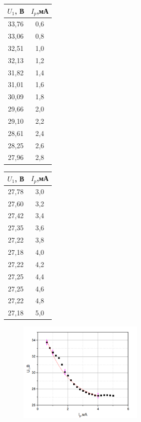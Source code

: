 \documentclass[a4paper]{article}
\begin{document}
  \begin{table}[!h]
  \begin{floatrow}
   \ttabbox[\FBwidth]{}%
           {
\begin{tabular}{|c|c|}
\hline
$U_1$, В & $I_p$,мА \\ \hline
33,76   & 0,6     \\ \hline
33,06   & 0,8     \\ \hline
32,51   & 1,0       \\ \hline
32,13   & 1,2     \\ \hline
31,82   & 1,4     \\ \hline
31,01   & 1,6     \\ \hline
30,09   & 1,8     \\ \hline
29,66   & 2,0       \\ \hline
29,10    & 2,2     \\ \hline
28,61   & 2,4     \\ \hline
28,25   & 2,6     \\ \hline
27,96   & 2,8     \\ \hline
\end{tabular}
    }
   \ttabbox[\FBwidth]{}%
           {
\begin{tabular}{|c|c|}
\hline
$U_1$, В & $I_p$,мА \\ \hline
27,78   & 3,0       \\ \hline
27,60    & 3,2     \\ \hline
27,42   & 3,4     \\ \hline
27,35   & 3,6     \\ \hline
27,22   & 3,8     \\ \hline
27,18   & 4,0       \\ \hline
27,22   & 4,2     \\ \hline
27,25   & 4,4     \\ \hline
27,25   & 4,6     \\ \hline
27,22   & 4,8     \\ \hline
27,18   & 5,0       \\ \hline
\end{tabular}
           }
\end{floatrow}
\end{table}

\newpage
\begin{figure}[!h]
\centering
\includegraphics[width = 0.55\textwidth]{graph_1.png}
\end{figure}
\end{document}
